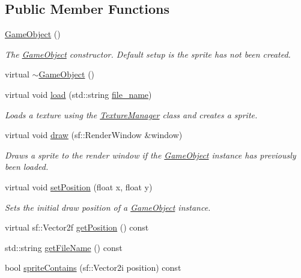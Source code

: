 \subsection*{Public Member Functions}
\begin{DoxyCompactItemize}
\item 
\hyperlink{class_game_object_a0348e3ee2e83d56eafca7a3547f432c4}{Game\+Object} ()
\begin{DoxyCompactList}\small\item\em The \hyperlink{class_game_object}{Game\+Object} constructor. Default setup is the sprite has not been created. \end{DoxyCompactList}\item 
virtual \hyperlink{class_game_object_a224d4f6d9dd75c8a6f9d022eaf586fd9}{$\sim$\+Game\+Object} ()
\item 
virtual void \hyperlink{class_game_object_acc593e5b75a58c4a59ad59da654ce807}{load} (std\+::string \hyperlink{class_game_object_a1b725daa9c79833a7139469468dc770a}{file\+\_\+name})
\begin{DoxyCompactList}\small\item\em Loads a texture using the \hyperlink{class_texture_manager}{Texture\+Manager} class and creates a sprite. \end{DoxyCompactList}\item 
virtual void \hyperlink{class_game_object_abf4de46e52c8f23d18d51bc29744b136}{draw} (sf\+::\+Render\+Window \&window)
\begin{DoxyCompactList}\small\item\em Draws a sprite to the render window if the \hyperlink{class_game_object}{Game\+Object} instance has previously been loaded. \end{DoxyCompactList}\item 
virtual void \hyperlink{class_game_object_a180d6e9e7afa44b30ca678a95c6f4dad}{set\+Position} (float x, float y)
\begin{DoxyCompactList}\small\item\em Sets the initial draw position of a \hyperlink{class_game_object}{Game\+Object} instance. \end{DoxyCompactList}\item 
virtual sf\+::\+Vector2f \hyperlink{class_game_object_a380c5cec0ed79277359dbbb9935f1ffe}{get\+Position} () const 
\item 
std\+::string \hyperlink{class_game_object_a387e235ced0f778e58d5f4a39f58a220}{get\+File\+Name} () const 
\item 
bool \hyperlink{class_game_object_adf7e04407f7c2a5bd487b459efe9fd79}{sprite\+Contains} (sf\+::\+Vector2i position) const 

\end{DoxyCompactItemize}
